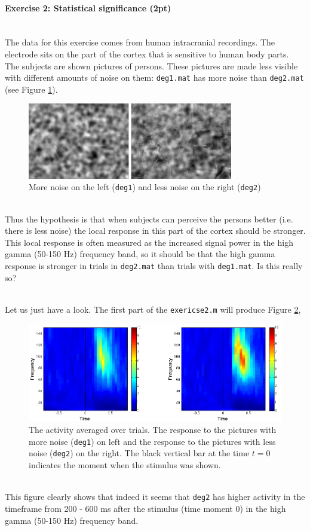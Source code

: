 \documentclass[a4paper,11pt]{article}
\newenvironment{exercise}[3]{\paragraph{Exercise #1: #2 (#3pt)}\ \\}{
\medskip}
\begin{document}
%
%
\begin{exercise}{2}{Statistical significance}{2}
The data for this exercise comes from human intracranial recordings. The electrode sits on the part of the cortex that is sensitive to human body parts. The subjects are shown pictures of persons. These pictures are made less visible with different amounts of noise on them: \texttt{deg1.mat} has more noise than \texttt{deg2.mat} (see Figure \ref{fig:noisypic}).
\begin{figure}[H]
	\centering
	\includegraphics[width=0.8\textwidth]{noisypic.png} 
	\caption{More noise on the left (\texttt{deg1}) and less noise on the right (\texttt{deg2})}
	\label{fig:noisypic}
	\vspace{-18pt}
\end{figure}
\ \\
Thus the hypothesis is that when subjects can perceive the persons better (i.e. there is less noise) the local response in this part of the cortex should be stronger. This local response is often measured as the increased signal power in the high gamma (50-150 Hz) frequency band, so it should be that the high gamma response is stronger in trials in \texttt{deg2.mat} than trials with \texttt{deg1.mat}. Is this really so?

\ \\
Let us just have a look. The first part of the \texttt{exericse2.m} will produce Figure \ref{fig:avgheatmap},
\begin{figure}[H]
	\centering
	\includegraphics[width=1.0\textwidth]{avgheatmap.png}
	\caption{The activity averaged over trials. The response to the pictures with more noise (\texttt{deg1}) on left and the response to the pictures with less noise (\texttt{deg2}) on the right. The black vertical bar at the time $t=0$ indicates the moment when the stimulus was shown.}
	\label{fig:avgheatmap}
   	\vspace{-18pt}
\end{figure}
\end{exercise}
\ \\
This figure clearly shows that indeed it seems that \texttt{deg2} has higher activity in the timeframe from 200 - 600 ms after the stimulus (time moment 0) in the high gamma (50-150 Hz) frequency band.
\end{document}
